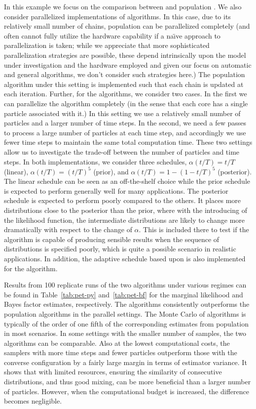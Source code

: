 In this example we focus on the comparison between \smc[2] and population
\mcmc. We also consider parallelized implementations of algorithms. In this
case, due to its relatively small number of chains, population \mcmc can be
parallelized completely (and often cannot fully utilize the hardware
capability if a na\"\i ve approach to parallelization is taken; while we
appreciate that more sophisticated parallelization strategies are possible,
these depend intrinsically upon the model under investigation and the hardware
employed and given our focus on automatic and general algorithms, we don't
consider such strategies here.) The population \mcmc algorithm under this
setting is implemented such that each chain is updated at each iteration.
Further, for the \smc algorithms, we consider two cases. In the first we can
parallelize the algorithm completely (in the sense that each core has a single
particle associated with it.) In this setting we use a relatively small number
of particles and a larger number of time steps. In the second, we need a few
passes to process a large number of particles at each time step, and
accordingly we use fewer time steps to maintain the same total computation
time. These two settings allow us to investigate the trade-off between the
number of particles and time steps. In both implementations, we consider three
schedules, $\alpha(t/T) = t/T$ (linear), $\alpha(t/T) = (t/T)^5$ (prior), and
$\alpha(t/T) = 1 - (1 - t/T)^5$ (posterior). The linear schedule can be seen
as an off-the-shelf choice while the prior schedule is expected to perform
generally well for many applications. The posterior schedule is expected to
perform poorly compared to the others. It places more distributions close to
the posterior than the prior, where with the introducing of the likelihood
function, the intermediate distributions are likely to change more
dramatically with respect to the change of $\alpha$. This is included there to
test if the algorithm is capable of producing sensible results when the
sequence of distributions is specified poorly, which is quite a possible
scenario in realistic applications. In addition, the adaptive schedule based
upon \cess is also implemented for the \smc[2] algorithm.

Results from 100 replicate runs of the two algorithms under various regimes
can be found in Table~\ref{tab:pet-py} and~\ref{tab:pet-bf} for the marginal
likelihood and Bayes factor estimates, respectively. The \smc algorithms
consistently outperforms the population \mcmc algorithms in the parallel
settings. The Monte Carlo \sd of \smc algorithms is typically of the order of
one fifth of the corresponding estimates from population \mcmc in most
scenarios. In some settings with the smaller number of samples, the two
algorithms can be comparable. Also at the lowest computational costs, the
samplers with more time steps and fewer particles outperform those with the
converse configuration by a fairly large margin in terms of estimator
variance. It shows that with limited resources, ensuring the similarity of
consecutive distributions, and thus good mixing, can be more beneficial than a
larger number of particles. However, when the computational budget is
increased, the difference becomes negligible.

